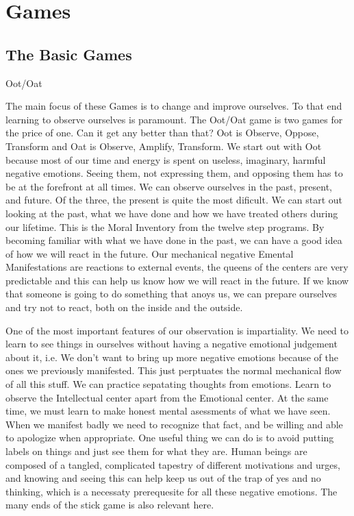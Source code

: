 \documentclass[12pt,letterpaper]{book}
\begin{document}
\chapter{Games}
\section{The Basic Games}

Oot/Oat

The main focus of these Games is to change and improve ourselves. To that end learning to observe ourselves is paramount. The Oot/Oat game is two games for the price of one. Can it get any better than that? Oot is Observe, Oppose, Transform and Oat is Observe, Amplify, Transform. We start out with Oot because most of our time and energy is spent on useless, imaginary, harmful negative emotions. Seeing them, not expressing them, and opposing them has to be at the forefront at all times. We can observe ourselves in the past, present, and future. Of the three, the present is quite the most dificult. We can start out looking at the past, what we have done and how we have treated others during our lifetime. This is the Moral Inventory from the twelve step programs. By becoming familiar with what we have done in the past, we can have a good idea of how we will react in the future. Our mechanical negative Emental Manifestations are reactions to external events, the queens of the centers are very predictable and this can help us know how we will react in the future. If we know that someone is going to do something that anoys us, we can prepare ourselves and try not to react, both on the inside and the outside.

One of the most important features of our observation is impartiality. We need to learn to see things in ourselves without having a negative emotional judgement about it, i.e. We don't want to bring up more negative emotions because of the ones we previously manifested. This just perptuates the normal mechanical flow of all this stuff. We can practice sepatating thoughts from emotions. Learn to observe the Intellectual center apart from the Emotional center. At the same time, we must learn to make honest mental asessments of what we have seen. When we manifest badly we need to recognize that fact, and be willing and able to apologize when appropriate. One useful thing we can do is to avoid putting labels on things and just see them for what they are. Human beings are composed of a tangled, complicated tapestry of different motivations and urges, and knowing and seeing this can help keep us out of the trap of yes and no thinking, which is a necessaty prerequesite for all these negative emotions. The many ends of the stick game is also relevant here.
\end{document}
